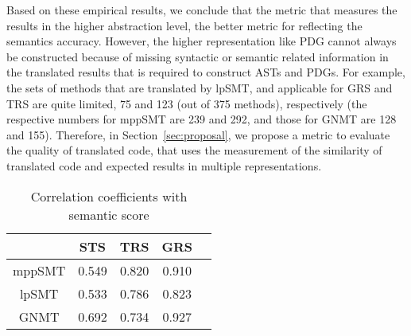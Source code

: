 Based on these empirical results, we conclude that the metric that
measures the results in the higher abstraction level, the better
metric for reflecting the semantics accuracy. However, the higher
representation like PDG cannot always be constructed because of
missing syntactic or semantic related information in the translated
results that is required to construct ASTs and PDGs. For example, the
sets of methods that are translated by lpSMT, and applicable for GRS
and TRS are quite limited, 75 and 123 (out of 375 methods),
respectively (the respective numbers for mppSMT are 239 and 292, and
those for GNMT are 128 and 155). Therefore, in
Section~\ref{sec:proposal}, we propose a metric to evaluate the
quality of translated code, that uses the measurement of the
similarity of translated code and expected results in multiple
representations.



\begin{table}
\centering
\caption{Correlation coefficients with semantic score}
\begin{tabular}{|c|c|c|c|c|}
\hline
 & STS & TRS & GRS\\
\hline
mppSMT  & 0.549 & 0.820 & 0.910 \\
\hline
lpSMT  & 0.533 & 0.786 & 0.823 \\
\hline
GNMT & 0.692 & 0.734 & 0.927 \\
\hline
\end{tabular}
\label{table:correlation}
\end{table}


%

